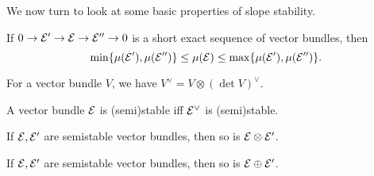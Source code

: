 We now turn to look at some basic properties of slope stability.

\begin{proposition}
    If $0\to\mathcal{E}'\to\mathcal{E}\to\mathcal{E}''\to0$ is a short exact sequence of vector
    bundles, then
    \begin{equation*}
        \min\{\mu(\mathcal{E}'),\mu(\mathcal{E}'')\}
            \le \mu(\mathcal{E}) \le \max\{\mu(\mathcal{E}'),\mu(\mathcal{E}'')\}.
    \end{equation*}
\end{proposition}

\begin{lemma}
    For a vector bundle $V$, we have $V^\vee=V\otimes(\det V)^\vee$.
\end{lemma}

\begin{proposition}
    A vector bundle $\mathcal{E}$ is (semi)stable iff $\mathcal{E}^\vee$ is (semi)stable.
\end{proposition}

\begin{proposition}
    If $\mathcal{E},\mathcal{E}'$ are semistable vector bundles, then so is
    $\mathcal{E}\otimes\mathcal{E}'$.
\end{proposition}

\begin{proposition}
    If $\mathcal{E},\mathcal{E}'$ are semistable vector bundles, then so is
    $\mathcal{E}\oplus\mathcal{E}'$.
\end{proposition}

